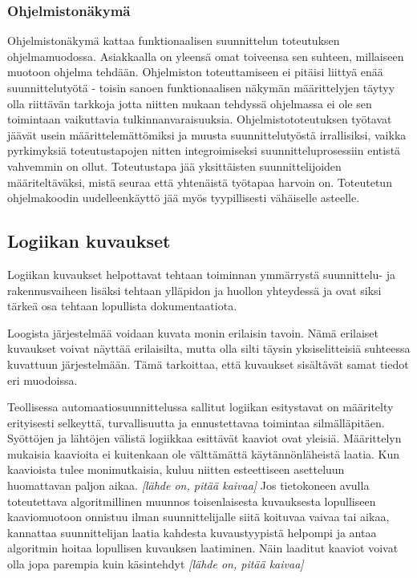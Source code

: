 \documentclass[finnish,12pt]{article}
\begin{document}
		\subsubsection{Ohjelmistonäkymä}

Ohjelmistonäkymä kattaa funktionaalisen suunnittelun toteutuksen ohjelmamuodossa.
Asiakkaalla on yleensä omat toiveensa sen suhteen, millaiseen muotoon ohjelma tehdään.
Ohjelmiston toteuttamiseen ei pitäisi liittyä enää suunnittelutyötä - toisin sanoen funktionaalisen näkymän määrittelyjen täytyy olla riittävän tarkkoja jotta niitten mukaan tehdyssä ohjelmassa ei ole sen toimintaan vaikuttavia tulkinnanvaraisuuksia.
Ohjelmistototeutuksen työtavat jäävät usein määrittelemättömiksi ja muusta suunnittelutyöstä irrallisiksi,
vaikka pyrkimyksiä toteutustapojen nitten integroimiseksi suunnitteluprosessiin entistä vahvemmin on ollut.
Toteutustapa jää yksittäisten suunnittelijoiden määriteltäväksi, mistä seuraa että yhtenäistä työtapaa harvoin on.
Toteutetun ohjelmakoodin uudelleenkäyttö jää myös tyypillisesti vähäiselle asteelle.


	\subsection{Logiikan kuvaukset}

Logiikan kuvaukset helpottavat tehtaan toiminnan ymmärrystä suunnittelu- ja rakennusvaiheen lisäksi tehtaan ylläpidon ja huollon yhteydessä ja
ovat siksi tärkeä osa tehtaan lopullista dokumentaatiota.

Loogista järjestelmää voidaan kuvata monin erilaisin tavoin.
Nämä erilaiset kuvaukset voivat näyttää erilaisilta, mutta olla silti täysin yksiselitteisiä suhteessa kuvattuun järjestelmään.
Tämä tarkoittaa, että kuvaukset sisältävät samat tiedot eri muodoissa.

Teollisessa automaatiosuunnittelussa sallitut logiikan esitystavat on määritelty erityisesti selkeyttä, turvallisuutta ja ennustettavaa toimintaa silmälläpitäen.
Syöttöjen ja lähtöjen välistä logiikkaa esittävät kaaviot ovat yleisiä.
Määrittelyn mukaisia kaavioita ei kuitenkaan ole välttämättä käytännönläheistä laatia.
Kun kaavioista tulee monimutkaisia, kuluu niitten esteettiseen asetteluun huomattavan paljon aikaa. \emph{[lähde on, pitää kaivaa]}
Jos tietokoneen avulla toteutettava algoritmillinen muunnos toisenlaisesta kuvauksesta lopulliseen kaaviomuotoon onnistuu ilman suunnittelijalle siitä koituvaa vaivaa tai aikaa,
kannattaa suunnittelijan laatia kahdesta kuvaustyypistä helpompi ja antaa algoritmin hoitaa lopullisen kuvauksen laatiminen.
Näin laaditut kaaviot voivat olla jopa parempia kuin käsintehdyt  \emph{[lähde on, pitää kaivaa]}
\end{document}

